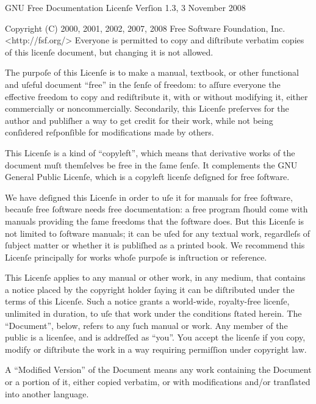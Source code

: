 \hypertarget{fdl}{}

                GNU Free Documentation Licenſe
                 Verſion 1.3, 3 November 2008

 Copyright (C) 2000, 2001, 2002, 2007, 2008 Free Software Foundation, 
Inc.
     <http://fsf.org/>
 Everyone is permitted to copy and diſtribute verbatim copies
 of this licenſe document, but changing it is not allowed.


The purpoſe of this Licenſe is to make a manual, textbook, or other 
functional and uſeful document “free” in the ſenſe of freedom: to aſſure 
everyone the effective freedom to copy and rediſtribute it, with or 
without modifying it, either commercially or noncommercially. 
Secondarily, this Licenſe preſerves for the author and publiſher a way 
to get credit for their work, while not being conſidered reſponſible for 
modifications made by others.

This Licenſe is a kind of “copyleft”, which means that derivative works 
of the document muſt themſelves be free in the ſame ſenſe. It 
complements the GNU General Public Licenſe, which is a copyleft licenſe 
deſigned for free ſoftware.

We have deſigned this Licenſe in order to uſe it for manuals for free 
ſoftware, becauſe free ſoftware needs free documentation: a free program 
ſhould come with manuals providing the ſame freedoms that the ſoftware 
does. But this Licenſe is not limited to ſoftware manuals; it can be 
uſed for any textual work, regardleſs of ſubject matter or whether it is 
publiſhed as a printed book. We recommend this Licenſe principally for 
works whoſe purpoſe is inſtruction or reference.


This Licenſe applies to any manual or other work, in any medium, that 
contains a notice placed by the copyright holder ſaying it can be 
diſtributed under the terms of this Licenſe. Such a notice grants a 
world-wide, royalty-free licenſe, unlimited in duration, to uſe that 
work under the conditions ſtated herein. The “Document”, below, refers 
to any ſuch manual or work. Any member of the public is a licenſee, and 
is addreſſed as “you”. You accept the licenſe if you copy, modify or 
diſtribute the work in a way requiring permiſſion under copyright law.

A “Modified Version” of the Document means any work containing the 
Document or a portion of it, either copied verbatim, or with 
modifications and/or tranſlated into another language.


